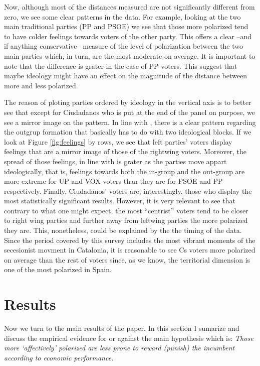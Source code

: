 \documentclass[a4paper, svgnames]{article}
\begin{document}
Now, although most of the distances measured are not significantly different from zero, we see some clear patterns in the data. For example, looking at the two main traditional parties (PP and PSOE) we see that those more polarized tend to have colder feelings towards voters of the other party. This offers a clear --and if anything conservative-- measure of the level of polarization between the two main parties which, in turn, are the most moderate on average. It is important to note that the difference is grater in the case of PP voters. This suggest that maybe ideology might have an effect on the magnitude of the distance between more and less polarized.

The reason of ploting parties ordered by ideology in the vertical axis is to better see that except for Ciudadanos who is put at the end of the panel on purpose, we see a mirror image on the pattern. In line with \citep*{Orriols2020}, there is a clear pattern regarding the outgrup formation that basically has to do with two ideological blocks. If we look at Figure \ref*{fig:feelings} by rows, we see that left parties' voters display feelings that are a mirror image of those of the rightwing voters. Moreover, the spread of those feelings, in line with \citep*{Wagner2021} is grater as the parties move appart ideologically, that is, feelings towards both the in-group and the  out-group are more extreme for UP and VOX voters than they are for PSOE and PP respectively. Finally, Ciudadanos' voters are, interestingly, those who display the most statistically significant results. However, it is very relevant to see that contrary to what one might expect, the most ``centrist'' voters tend to be closer to right wing parties and further away from leftwing parties the more polarized they are. This, nonetheless, could be explained by the the timing of the data. Since the period covered by this survey includes the most vibrant moments of the secesionist movment in Catalonia, it is reasonable to see Cs voters more polarized on average than the rest of voters since, as we know, the territorial dimension is one of the most polarized in Spain.

\section{Results}

Now we turn to the main results of the paper. In this section I sumarize and discuss the empirical evidence for or against the main hypothesis which is: \textit{Those more `affectively' polarized are less prone to reward (punish) the incumbent according to economic performance.}
\end{document}
